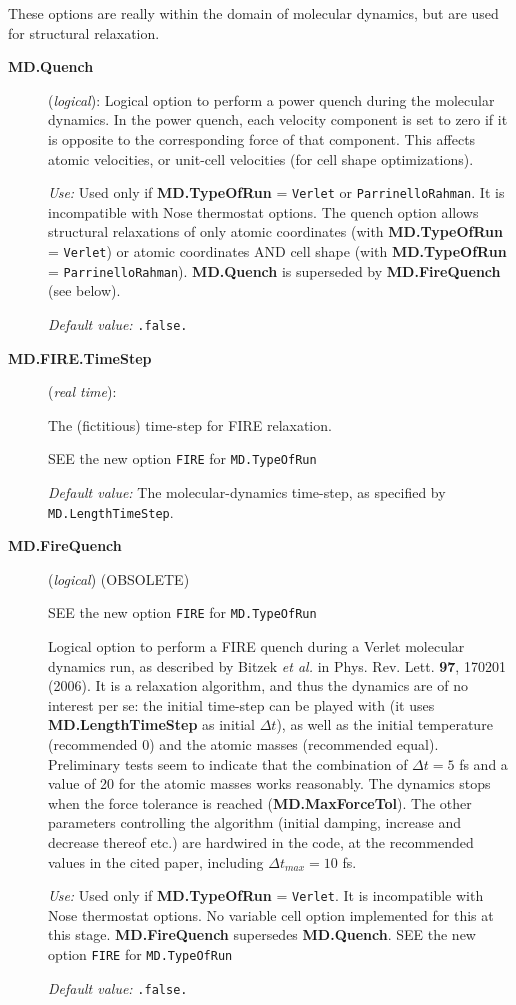 \documentclass[11pt]{article}
\begin{document}
These options are really within the domain of molecular dynamics, but
are used for structural relaxation.

\begin{description}
\item[{\bf MD.Quench}] ({\it logical}): 
Logical option to perform a power quench during the molecular dynamics. 
In the power quench, each velocity component is set to
zero if it is opposite to the corresponding force
of that component. This affects atomic velocities,
or unit-cell velocities (for cell shape optimizations).

{\it Use:} Used only if {\bf MD.TypeOfRun} = {\tt Verlet} or 
{\tt ParrinelloRahman}.
It is incompatible with Nose thermostat options.
The quench option allows structural relaxations of
only atomic coordinates (with {\bf MD.TypeOfRun} = {\tt Verlet})
or atomic coordinates AND cell shape 
(with {\bf MD.TypeOfRun} = {\tt ParrinelloRahman}).
{\bf MD.Quench} is superseded by {\bf MD.FireQuench} (see below).

{\it Default value:} {\tt .false.}

\item[{\bf MD.FIRE.TimeStep}] ({\it real time}): 

The (fictitious) time-step for FIRE relaxation. 

SEE the new option {\tt FIRE} for {\tt MD.TypeOfRun}

{\it Default value:} The molecular-dynamics time-step, as
specified by {\tt MD.LengthTimeStep}.

\item[{\bf MD.FireQuench}] ({\it logical}) (OBSOLETE)

 SEE the new option {\tt FIRE} for {\tt MD.TypeOfRun}

Logical option to perform a FIRE quench during a Verlet molecular dynamics
run, as described by Bitzek {\it et al.} in Phys. Rev. Lett. {\bf 97},
170201 (2006). It is a relaxation algorithm, and thus the dynamics
are of no interest per se: the initial time-step can be played with
(it uses {\bf MD.LengthTimeStep} as initial $\Delta t$),
as well as the initial temperature (recommended 0) and the atomic
masses (recommended equal). Preliminary tests seem to indicate that 
the combination of $\Delta t = 5$ fs and a value of 20 for the atomic 
masses works reasonably. The dynamics stops when the force
tolerance is reached ({\bf MD.MaxForceTol}). The other
parameters controlling the algorithm (initial damping, 
increase and decrease thereof etc.) are hardwired in the code,
at the recommended values in the cited paper,
including $\Delta t_{max} = 10$ fs.

{\it Use:} Used only if {\bf MD.TypeOfRun} = {\tt Verlet}. 
It is incompatible with Nose thermostat options. No variable
cell option implemented for this at this stage.
{\bf MD.FireQuench} supersedes {\bf MD.Quench}.  SEE the new
option {\tt FIRE} for {\tt MD.TypeOfRun}

{\it Default value:} {\tt .false.}

\end{description}
\end{document}
